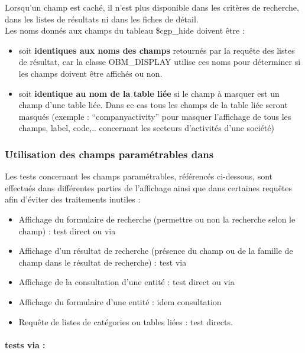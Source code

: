 Lorsqu'un champ est caché, il n'est plus disponible dans les critères de recherche, dans les listes de résultats ni dans les fiches de détail.\\

Les noms donnés aux champs du tableau \$cgp\_hide doivent être :\\
\begin{itemize}
\item soit \textbf{identiques aux noms des champs} retournés par la requête des listes de résultat, car la classe OBM\_DISPLAY utilise ces noms pour déterminer si les champs doivent être affichés ou non.
\item soit \textbf{identique au nom de la table liée} si le champ à masquer est un champ d'une table liée. Dans ce cas tous les champs de la table liée seront masqués (exemple : ``companyactivity'' pour masquer l'affichage de tous les champs, label, code,.. concernant les secteurs d'activités d'une société) 
\end{itemize}


\subsubsection{Utilisation des champs paramétrables dans \obm}

Les tests concernant les champs paramétrables, référencés ci-dessous, sont effectués dans différentes parties de l'affichage ainsi que dans certaines requêtes afin d'éviter des traitements inutiles :\\

\begin{itemize}
\item Affichage du formulaire de recherche (permettre ou non la recherche selon le champ) : test direct ou via 
\item Affichage d'un résultat de recherche (présence du champ ou de la famille de champ dans le résultat de recherche) : test via 
\item Affichage de la consultation d'une entité : test direct ou via 
\item Affichage du formulaire d'une entité : idem consultation
\item Requête de listes de catégories ou tables liées : test directs.
\end{itemize}

\paragraph{tests via  :}


